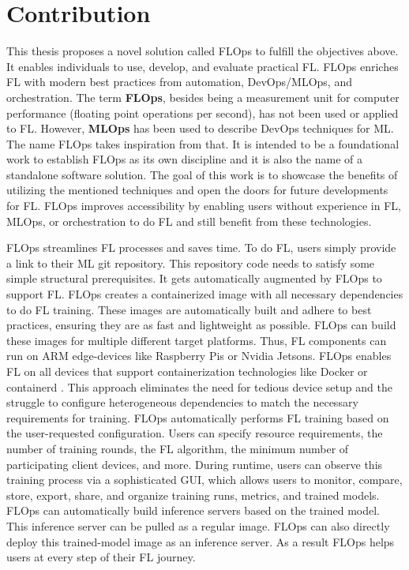\section{Contribution}

This thesis proposes a novel solution called FLOps to fulfill the objectives above.
It enables individuals to use, develop, and evaluate practical FL.
FLOps enriches FL with modern best practices from automation, DevOps/MLOps, and orchestration.
The term \textbf{FLOps}, besides being a measurement unit for computer performance (floating point operations per second), has not been used or applied to FL.
However, \textbf{MLOps} has been used to describe DevOps techniques for ML.
The name FLOps takes inspiration from that.
It is intended to be a foundational work to establish FLOps as its own discipline and it is also the name of a standalone software solution.
The goal of this work is to showcase the benefits of utilizing the mentioned techniques and open the doors for future developments for FL.
FLOps improves accessibility by enabling users without experience in FL, MLOps, or orchestration to do FL and still benefit from these technologies.

FLOps streamlines FL processes and saves time.
To do FL, users simply provide a link to their ML git repository.
This repository code needs to satisfy some simple structural prerequisites.
It gets automatically augmented by FLOps to support FL.
FLOps creates a containerized image with all necessary dependencies to do FL training.
These images are automatically built and adhere to best practices, ensuring they are as fast and lightweight as possible.
FLOps can build these images for multiple different target platforms.
Thus, FL components can run on ARM edge-devices like Raspberry Pis or Nvidia Jetsons.
FLOps enables FL on all devices that support containerization technologies like Docker or containerd \cite{containerd_docs}.
This approach eliminates the need for tedious device setup and the struggle to configure heterogeneous dependencies to match the necessary requirements for training.
FLOps automatically performs FL training based on the user-requested configuration.
Users can specify resource requirements, the number of training rounds, the FL algorithm, the minimum number of participating client devices, and more.
During runtime, users can observe this training process via a sophisticated GUI, which allows users to monitor, compare, store, export, share, and organize training runs, metrics, and trained models.
FLOps can automatically build inference servers based on the trained model.
This inference server can be pulled as a regular image.
FLOps can also directly deploy this trained-model image as an inference server.
As a result FLOps helps users at every step of their FL journey.


